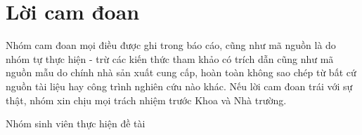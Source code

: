 \chapter*{Lời cam đoan}
\vspace{1.0cm}
Nhóm cam đoan mọi điều được ghi trong báo cáo, cũng như mã nguồn là do nhóm tự thực hiện - trừ các kiến thức tham khảo có trích dẫn cũng như mã nguồn mẫu do chính nhà sản xuất cung cấp, hoàn toàn không sao chép từ bất cứ nguồn tài liệu hay công trình nghiên cứu nào khác. Nếu lời cam đoan trái với sự thật, nhóm xin chịu mọi trách nhiệm trước Khoa và Nhà trường.
\begin{flushright}
Nhóm sinh viên thực hiện đề tài 
\end{flushright}


\bigskip
 
